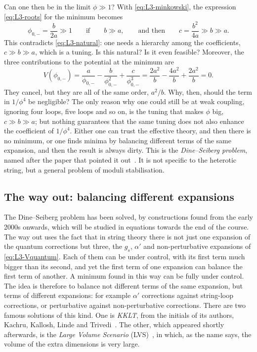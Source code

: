 Can one then be in the limit $\phi\gg1$? With \cref{eq:L3-minkowski}, the expression \cref{eq:L3-roots} for the minimum becomes
\begin{equation}
  \phi_{0,-} = \frac{b}{2a}\gg1\qquad\text{if}\qquad b\gg a ,
  \qquad\text{and then}\qquad
  c = \frac{b^2}{4a}\gg b\gg a .
  \label{eq:L3-hierarchy}
\end{equation}
This contradicts \cref{eq:L3-natural}: one needs a hierarchy among the coefficients, $c\gg b\gg a$, which is a tuning. Is this natural? Is it even feasible? Moreover, the three contributions to the potential at the minimum are
\begin{equation}
  V(\phi_{0,-}) = \frac{a}{\phi_{0,-}} - \frac{b}{\phi_{0,-}^2} + \frac{c}{\phi_{0,-}^3}
  = \frac{2a^2}{b} - \frac{4a^2}{b} + \frac{2a^2}{b} = 0 .
  \label{eq:L3-terms}
\end{equation}
They cancel, but they are all of the same order, $a^2/b$. Why, then, should the term in $1/\phi^4$ be negligible? The only reason why one could still be at weak coupling, ignoring four loops, five loops and so on, is the tuning that makes $\phi$ big, $c\gg b\gg a$; but nothing guarantees that the same tuning does not also enhance the coefficient of $1/\phi^4$. Either one can trust the effective theory, and then there is no minimum, or one finds minima by balancing different terms of the same expansion, and then the result is always dirty. This is the \emph{Dine--Seiberg problem}, named after the paper that pointed it out~\cite{DineSeiberg}. It is not specific to the heterotic string, but a general problem of moduli stabilisation.

\subsection{The way out: balancing different expansions}
\label{sec:L3-way-out}

The Dine--Seiberg problem has been solved, by constructions found from the early 2000s onwards, which will be studied in equations towards the end of the course. The way out uses the fact that in string theory there is not just one expansion of the quantum corrections but three, the $g_s$, $\alpha'$ and non-perturbative expansions of \cref{eq:L3-Vquantum}. Each of them can be under control, with its first term much bigger than its second, and yet the first term of one expansion can balance the first term of another. A minimum found in this way can be fully under control. The idea is therefore to balance not different terms of the same expansion, but terms of different expansions: for example $\alpha'$ corrections against string-loop corrections, or perturbative against non-perturbative corrections. There are two famous solutions of this kind. One is \emph{KKLT}, from the initials of its authors, Kachru, Kallosh, Linde and Trivedi~\cite{KKLT}. The other, which appeared shortly afterwards, is the \emph{Large Volume Scenario} (LVS)~\cite{LVS}, in which, as the name says, the volume of the extra dimensions is very large.

